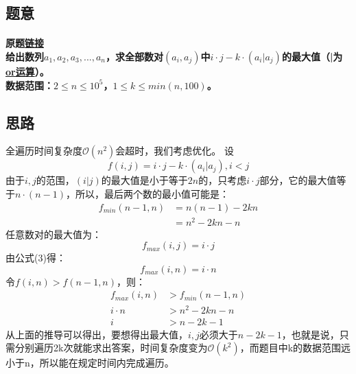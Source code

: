 \documentclass[cyan,pad,cn]{elegantnote}
\begin{document}
\subsection{题意}

\paragraph{原题\href{https://codeforces.com/contest/1554/problem/B}{链接}
    \\给出数列\(a_{1},a_{2},a_{3},...,a_{n}\)，求全部数对\((a_{i},a_{j})\)中\(i\cdot j-k\cdot (a_{i}|a_{j})\)的最大值（|为\href{https://baike.baidu.com/item/位运算/6888804?fr=aladdin}{or运算}）。
    \\数据范围：\(2 \leqslant  n \leqslant  10^5\)，\(1 \leqslant  k \leqslant min(n,100)\)。
}

\subsection{思路}

\begin{paragraph}
    全遍历时间复杂度\(\mathcal{O}(n^2)\)会超时，我们考虑优化。
    设
    \begin{equation}
        f(i,j)=i\cdot j-k\cdot (a_{i}|a_{j}),i<j
    \end{equation}
    由于\(i,j\)的范围，\((i|j)\)的最大值是小于等于\(2n\)的，只考虑\(i\cdot j\)部分，它的最大值等于\(n\cdot (n-1)\)，所以，最后两个数的最小值可能是：
    \begin{equation}
        \begin{split}
        f_{min}(n-1,n)&=n(n-1)-2kn\\
        &=n^2-2kn-n
        \end{split}
    \end{equation}
    任意数对的最大值为：
    \begin{equation}
        f_{max}(i,j)=i\cdot j
    \end{equation}
    由公式(3)得：
    \begin{equation}
            f_{max}(i,n) = i\cdot n 
    \end{equation}
    令\(f(i,n)>f(n-1,n)\)，则：
    \begin{equation}
        \begin{split}
        f_{max}(i,n) &>f_{min}(n-1,n)\\
        i\cdot n &> n^2-2kn-n \\
        i &> n-2k-1
        \end{split}
    \end{equation}
    从上面的推导可以得出，要想得出最大值，\(i,j\)必须大于\(n-2k-1\)，也就是说，只需分别遍历2k次就能求出答案，时间复杂度变为\( \mathcal{O}(k^2)\)，而题目中k的数据范围远小于n，所以能在规定时间内完成遍历。
\end{paragraph}
\end{document}
